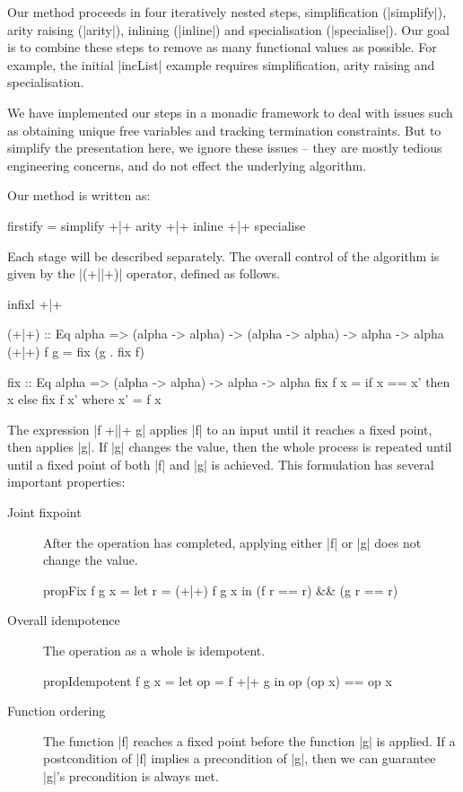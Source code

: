 \documentclass[preprint]{sigplanconf}
\begin{document}
Our method proceeds in four iteratively nested steps, simplification (|simplify|), arity raising (|arity|), inlining (|inline|) and specialisation (|specialise|). Our goal is to combine these steps to remove as many functional values as possible. For example, the initial |incList| example requires simplification, arity raising and specialisation.

We have implemented our steps in a monadic framework to deal with issues such as obtaining unique free variables and tracking termination constraints. But to simplify the presentation here, we ignore these issues -- they are mostly tedious engineering concerns, and do not effect the underlying algorithm.

Our method is written as:

\begin{code}
firstify = simplify +|+ arity +|+ inline +|+ specialise
\end{code}

Each stage will be described separately. The overall control of the algorithm is given by the |(+||+)| operator, defined as follows.

\begin{code}
infixl +|+

(+|+) :: Eq alpha => (alpha -> alpha) -> (alpha -> alpha) -> alpha -> alpha
(+|+) f g = fix (g . fix f)

fix :: Eq alpha => (alpha -> alpha) -> alpha -> alpha
fix f x = if x == x' then x else fix f x'
    where x' = f x
\end{code}

The expression |f +||+ g| applies |f| to an input until it reaches a fixed point, then applies |g|. If |g| changes the value, then the whole process is repeated until until a fixed point of both |f| and |g| is achieved. This formulation has several important properties:

\begin{description}
\item[Joint fixpoint] After the operation has completed, applying either |f| or |g| does not change the value.

\begin{code}
propFix f g x = let r = (+|+) f g x in (f r == r) && (g r == r)
\end{code}

\item[Overall idempotence] The operation as a whole is idempotent.

\begin{code}
propIdempotent f g x = let op = f +|+ g in op (op x) == op x
\end{code}

\item[Function ordering] The function |f| reaches a fixed point before the function |g| is applied. If a postcondition of |f| implies a precondition of |g|, then we can guarantee |g|'s precondition is always met.
\end{description}
\end{document}
